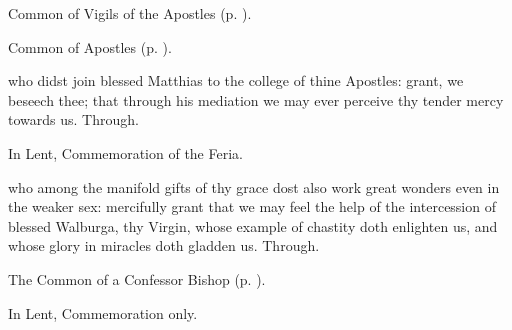 \label{MatthiasVigil}

\begin{rubric}
	Common of Vigils of the Apostles (p. \pageref{CommonVigilApostles}).
\end{rubric}



\begin{rubric}
	Common of Apostles (p. \pageref{CommonApostles}).
\end{rubric}

 who didst join blessed Matthias to the college of thine Apostles: grant, we beseech thee; that through his mediation we may ever perceive thy tender mercy towards us. Through.
\begin{rubric}
    In Lent, Commemoration of the Feria.
\end{rubric}


\clearpage
{}


\memorialCollect
{} who among the manifold gifts of thy grace dost also work great wonders even in the weaker sex: mercifully grant that we may feel the help of the intercession of blessed Walburga, thy Virgin, whose example of chastity doth enlighten us, and whose glory in miracles doth gladden us. Through.



\begin{rubric}
	The Common of a Confessor Bishop (p. \pageref{ConfessorBishopCollect}).
\end{rubric}



\begin{rubric}
	In Lent, Commemoration only.
\end{rubric}

